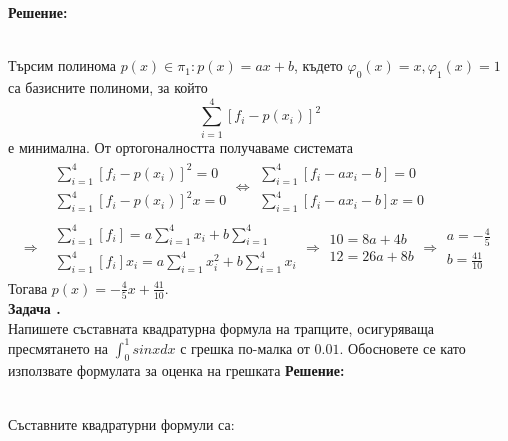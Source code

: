 \documentclass[12pt]{article}
\newcounter{problem}
\newcounter{solution}
\newcommand\problem{%
  \stepcounter{problem}%
  \textbf{Задача \theproblem.}~%
  \\
}
\newcommand\solution{%
  \textbf{Решение:}\\~%
}
\begin{document}
    \solution
        Търсим полинома $p(x) \in \pi_1:p(x) =ax+b$, където $\varphi_0(x) = x, \varphi_1(x) = 1$ са базисните полиноми, за който 
        \begin{equation*}
        \sum_{i=1}^{4}[f_i-p(x_i)]^2
        \end{equation*}
        е минимална.
        От ортогоналността получаваме системата
        \begin{align*}
        &\begin{array}{|c}
        \sum_{i=1}^{4}[f_i-p(x_i)]^2 = 0\\
        \sum_{i=1}^{4}[f_i-p(x_i)]^2x=0
        \end{array}
        \Leftrightarrow
        \begin{array}{|c}
        \sum_{i=1}^{4}[f_i-ax_i-b] = 0\\
        \sum_{i=1}^{4}[f_i-ax_i-b]x=0
        \end{array}\\
        \Rightarrow
        &\begin{array}{|c}
        \sum_{i=1}^{4}[f_i] =a\sum_{i=1}^{4}x_i+b\sum_{i=1}^{4}\\
        \sum_{i=1}^{4}[f_i]x_i=a\sum_{i=1}^{4}x_i^2 + b\sum_{i=1}^{4}x_i
        \end{array}
        \Rightarrow
        \begin{array}{|c}
        10 = 8a + 4b\\
        12 = 26a + 8b
        \end{array}
        \Rightarrow
        \boxed{
        \begin{array}{|c}
        a = -\frac{4}{5}\\
        b = \frac{41}{10}
        \end{array}}
        \end{align*}
        Тогава $p(x) = -\frac{4}{5}x+\frac{41}{10}$.\\
    \problem
        Напишете съставната квадратурна формула на трапците, осигуряваща пресмятането на $\int_{0}^{1}sinxdx$ с грешка по-малка от $0.01$. Обосновете се като използвате формулата за оценка на грешката
    \solution
    Съставните квадратурни формули са:\\
\end{document}
